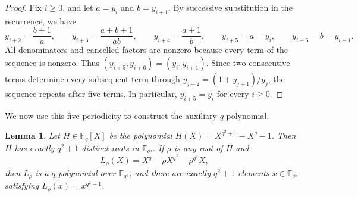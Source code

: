 \documentclass[12pt]{article}
\numberwithin{equation}{section}
\newtheorem{lemma}[theorem]{Lemma}
\theoremstyle{definition}
\newcommand{\F}{\mathbb F}
\begin{document}
\begin{proof}
Fix $i\ge0$, and let $a=y_i$ and $b=y_{i+1}$. By successive substitution in the recurrence, we have
\[
 y_{i+2}=\frac{b+1}{a},\qquad
 y_{i+3}=\frac{a+b+1}{ab},\qquad
 y_{i+4}=\frac{a+1}{b},\qquad
 y_{i+5}=a=y_i,\qquad
 y_{i+6}=b=y_{i+1}.
\]
All denominators and cancelled factors are nonzero because every term of the sequence is nonzero. Thus
$(y_{i+5},y_{i+6})=(y_i,y_{i+1})$. Since two consecutive terms determine every subsequent term through $y_{j+2}=(1+y_{j+1})/y_j$, the sequence repeats after five terms. In particular, $y_{i+5}=y_i$ for every $i\ge0$.
\end{proof}

We now use this five-periodicity to construct the auxiliary $q$-polynomial.

\begin{lemma}\label{lem:algebraic}
Let $H\in\F_q[X]$ be the polynomial $H(X)=X^{q^2+1}-X^q-1$.
Then $H$ has exactly $q^2+1$ distinct roots in $\F_{q^5}$. If $\rho$ is any root of $H$ and
\[
        L_\rho(X)=X^q-\rho X^{q^2}-\rho^{q^2}X,
\]
then $L_\rho$ is a $q$-polynomial over $\F_{q^5}$, and there are exactly $q^2+1$ elements $x\in\F_{q^5}$ satisfying $L_\rho(x)=x^{q^2+1}$.
\end{lemma}
\end{document}
